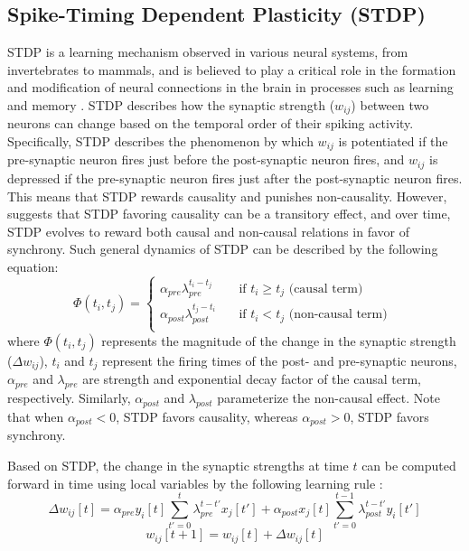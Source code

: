 \documentclass[10pt]{article} %
\begin{document}
    \subsection{Spike-Timing Dependent Plasticity (STDP)}\label{sec:stdp}
    STDP is a learning mechanism observed in various neural systems, from invertebrates to mammals, and is believed to play a critical role in the formation and modification of neural connections in the brain in processes such as learning and memory \citep{Gerstner2014}. 
    STDP describes how the synaptic strength ($w_{ij}$) between two neurons can change based on the temporal order of their spiking activity. 
    Specifically, STDP describes the phenomenon by which $w_{ij}$ is potentiated if the pre-synaptic neuron fires just before the post-synaptic neuron fires, and $w_{ij}$ is depressed if the pre-synaptic neuron fires just after the post-synaptic neuron fires.
    This means that STDP rewards causality and punishes non-causality. 
    However, \cite{Anisimova2022Spike-timing-dependentCausality} suggests that STDP favoring causality can be a transitory effect, and over time, STDP evolves to reward both causal and non-causal relations in favor of synchrony.
    Such general dynamics of STDP can be described by the following equation:
    \begin{equation}
    \label{eq:parametric_stdp}
    \Phi(t_i, t_j) = 
         \begin{cases}
           \alpha_{pre}\lambda_{pre}^{t_i-t_j} &\quad\text{if }t_i\ge t_j \text{ (causal term) }\\
           \alpha_{post}\lambda_{post}^{t_j-t_i} &\quad\text{if }t_i< t_j \text{ (non-causal term) }\\ 
         \end{cases}
    \end{equation}
    where $\Phi(t_i, t_j)$ represents the magnitude of the change in the synaptic strength ($\Delta w_{ij}$), $t_i$ and $t_j$ represent the firing times of the post- and pre-synaptic neurons, $\alpha_{pre}$ and $\lambda_{pre}$ are strength and exponential decay factor of the causal term, respectively. 
    Similarly, $\alpha_{post}$ and $\lambda_{post}$ parameterize the non-causal effect.
    Note that when $\alpha_{post}<0$, STDP favors causality, whereas  $\alpha_{post}>0$, STDP favors synchrony.

    Based on STDP, the change in the synaptic strengths at time $t$ can be computed forward in time
    using local variables by the following learning rule \citep{Gerstner2014}:
    \begin{equation}
        \label{eq:stdp}
        \Delta w_{ij}[t] = \alpha_{pre} y_i[t]\sum_{t'=0}^{t}\lambda_{pre}^{t-t'} x_j[t'] + \alpha_{post}x_j[t]\sum_{t'=0}^{t-1}\lambda_{post}^{t-t'} y_i[t'] %
    \end{equation}
    \begin{equation}
        w_{ij}[t+1] = w_{ij}[t] + \Delta w_{ij}[t]
    \end{equation}
\end{document}
